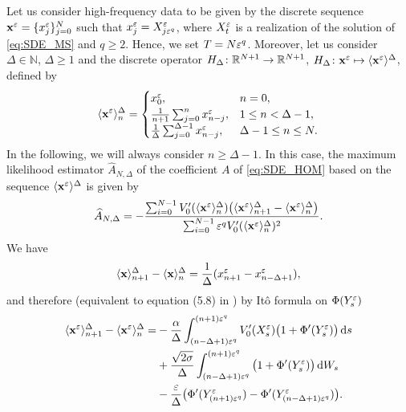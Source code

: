 \documentclass[10pt]{article}
\begin{document}
Let us consider high-frequency data to be given by the discrete sequence $\mathbf x^\varepsilon = \{x^\varepsilon_j\}_{j=0}^N$ such that $x^\varepsilon_j = X_{j\varepsilon^q}^\varepsilon$, where $X_t^\varepsilon$ is a realization of the solution of \eqref{eq:SDE_MS} and $q \geq 2$. Hence, we set $T = N\varepsilon^q$. Moreover, let us consider $\Delta \in \mathbb N$, $\Delta \geq 1$ and the discrete operator $H_\Delta\colon \mathbb{R}^{N+1} \to \mathbb{R}^{N+1}$, $H_\Delta \colon \mathbf x^\varepsilon \mapsto \langle \mathbf x^\varepsilon \rangle^\Delta$, defined by
\begin{equation}
	\langle \mathbf x^\varepsilon\rangle^\Delta_n = 
	\begin{cases}
		x^\varepsilon_0, &n = 0,\\
		\frac1{n+1} \sum_{j=0}^n x^\varepsilon_{n-j}, &1 \leq n < \Delta-1,\\
		\frac1\Delta \sum_{j=0}^{\Delta-1} x^\varepsilon_{n-j}, &\Delta - 1 \leq n \leq N.
	\end{cases} 
\end{equation}
In the following, we will always consider $n \geq \Delta - 1$. In this case, the maximum likelihood estimator $\widehat A_{N, \Delta}$ of the coefficient $A$ of \eqref{eq:SDE_HOM} based on the sequence $\langle \mathbf x^\varepsilon \rangle^\Delta$ is given by
\begin{equation}
	\widehat A_{N, \Delta} = -\frac{\sum_{i=0}^{N-1}V_0'(\langle \mathbf x^\varepsilon \rangle^\Delta_n)\big(\langle \mathbf x^\varepsilon\rangle^\Delta_{n+1} - \langle \mathbf x^\varepsilon\rangle^\Delta_n\big)}{\sum_{i=0}^{N-1} \varepsilon^q V_0'(\langle \mathbf x^\varepsilon \rangle^\Delta_n)^2}.
\end{equation}
We have 
\begin{equation}
	\langle \mathbf x\rangle^\Delta_{n+1} - \langle \mathbf x\rangle^\Delta_n = \frac1\Delta(x^\varepsilon_{n+1} - x^\varepsilon_{n-\Delta+1}),
\end{equation}
and therefore (equivalent to equation (5.8) in \cite{PaS07}) by Itô formula on $\Phi(Y^\varepsilon_s)$
\begin{equation}\label{eq:DiffDecomp}
\begin{aligned}
	\langle \mathbf x^\varepsilon\rangle^\Delta_{n+1} - \langle \mathbf x^\varepsilon\rangle^\Delta_n = 
	&-\frac{\alpha}{\Delta} \int_{(n-\Delta+1)\varepsilon^q}^{(n+1)\varepsilon^q} V_0'(X^\varepsilon_s)\big(1 + \Phi'(Y^\varepsilon_s)\big)\,\mathrm{d} s \\
	&+\frac{\sqrt{2\sigma}}{\Delta}\int_{(n-\Delta+1)\varepsilon^q}^{(n+1)\varepsilon^q} \big(1 + \Phi'(Y^\varepsilon_s)\big) \,\mathrm{d} W_s \\
	&-\frac{\varepsilon}{\Delta} \big(\Phi'(Y^\varepsilon_{(n+1)\varepsilon^q})- \Phi'(Y^\varepsilon_{(n-\Delta+1)\varepsilon^q})\big).
\end{aligned}
\end{equation}
\end{document}

